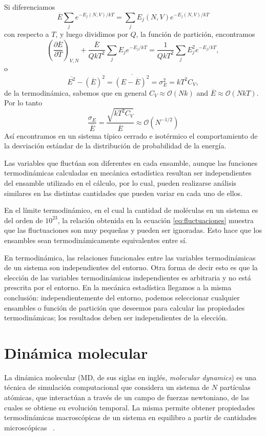 Si diferenciamos
$$
\overline{E} \sum_j e^{-E_j(N,V)/kT} = \sum_j E_j(N,V) e^{-E_j(N,V)/kT}
$$
con respecto a $T$, y luego dividimos por $Q$, la función de partición, encontramos
$$
\left(\frac{\partial\overline{E}}{\partial T}\right)_{V,N} + \frac{\overline{E}}{Q kT^2} \sum_j E_j e^{-E_j / kT} = \frac{1}{Q kT^2} \sum_j E_j^2 e^{-E_j/kT},
$$
o
$$
\overline{E^2} - (\overline{E})^2 = \overline{(E-\overline{E})^2} = \sigma_E^2 = k T^2 C_V,
$$
de la termodinámica, sabemos que en general $C_V \approx \mathcal{O}(Nk)$ and $\overline{E} \approx \mathcal{O}(NkT)$. Por lo tanto
\begin{equation}\label{eq:fluctuaciones}
    \frac{\sigma_E}{\overline{E}} = \frac{\sqrt{kT^2C_V}}{\overline{E}} \approx \mathcal{O}(N^{-1/2})
\end{equation}
Así encontramos en un sistema típico cerrado e isotérmico el comportamiento de la
desviación estándar de la distribución de probabilidad de la energía.

Las variables que fluctúan son diferentes en cada ensamble, aunque las funciones 
termodinámicas calculadas en mecánica estadística resultan ser independientes del 
ensamble utilizado en el cálculo, por lo cual, pueden realizarse análisis 
similares en las distintas cantidades que pueden variar en cada uno de ellos.

En el límite termodinámico, en el cual la cantidad de moléculas en un sistema es 
del orden de $10^{23}$, la relación obtenida en la ecuación \ref{eq:fluctuaciones} 
muestra que las fluctuaciones son muy pequeñas y pueden ser ignoradas. Esto hace 
que los ensambles sean termodinámicamente equivalentes entre sí.

En termodinámica, las relaciones funcionales entre las variables termodinámicas 
de un sistema son independientes del entorno. Otra forma de decir esto es que la 
elección de las variables termodinámicas independientes es arbitraria y no está 
prescrita por el entorno. En la mecánica estadística llegamos a la misma 
conclusión: independientemente del entorno, podemos seleccionar cualquier ensambles
o función de partición que deseemos para calcular las propiedades termodinámicas; 
los resultados deben ser independientes de la elección.


\section{Dinámica molecular}\label{md}

La dinámica molecular (MD, de sus siglas en inglés, \textit{molecular dynamics})
es una técnica de simulación computacional que considera un sistema de $N$
partículas atómicas, que interactúan a través de un campo de fuerzas newtoniano,
de las cuales se obtiene su evolución temporal. La misma permite obtener
propiedades termodinámicas macroscópicas de un sistema en equilibro a partir de 
cantidades microscópicas ~\cite{frenkel2001, allen2017}.

